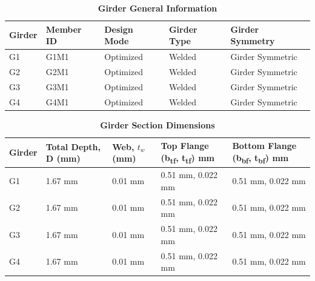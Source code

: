 \documentclass[12pt,a4paper]{report}
\numberwithin{table}{chapter}
\numberwithin{figure}{chapter}
\begin{document}
\newpage

\vspace{0.4em}
\noindent
            
\vspace{4pt}
\begin{longtable}{|L{2.2cm}|L{1.8cm}|p{3.8cm}|p{3.8cm}|p{3.8cm}|}
\caption{\textbf{Girder General Information}}
\hline
\textbf{Girder} & \textbf{Member ID} & \textbf{Design Mode} & \textbf{Girder Type} & \textbf{Girder Symmetry} \\[6pt]
\hline
G1 & G1M1 & Optimized & Welded & Girder Symmetric \\[8pt]
\hline
G2 & G2M1 & Optimized & Welded & Girder Symmetric \\[8pt]
\hline
G3 & G3M1 & Optimized & Welded & Girder Symmetric \\[8pt]
\hline
G4 & G4M1 & Optimized & Welded & Girder Symmetric \\[8pt]
\hline
\end{longtable}

\vspace{0.6em}

\vspace{4pt}
\begin{longtable}{|L{1.8cm}|L{2.3cm}|L{1.8cm}|p{4.8cm}|p{4.8cm}|}
\caption{\textbf{Girder Section Dimensions}}
\hline
\textbf{Girder} & \textbf{Total Depth, D (mm)} & \textbf{Web, $t_w$ (mm)} & \textbf{Top Flange (b\textsubscript{tf}, t\textsubscript{tf}) mm} & \textbf{Bottom Flange (b\textsubscript{bf}, t\textsubscript{bf}) mm} \\[6pt]
\hline
G1 & 1.67 mm & 0.01 mm & 0.51 mm, 0.022 mm & 0.51 mm, 0.022 mm \\[8pt]
\hline
G2 & 1.67 mm & 0.01 mm & 0.51 mm, 0.022 mm & 0.51 mm, 0.022 mm \\[8pt]
\hline
G3 & 1.67 mm & 0.01 mm & 0.51 mm, 0.022 mm & 0.51 mm, 0.022 mm \\[8pt]
\hline
G4 & 1.67 mm & 0.01 mm & 0.51 mm, 0.022 mm & 0.51 mm, 0.022 mm \\[8pt]
\hline
\end{longtable}

\vspace{0.6em}
\end{document}
